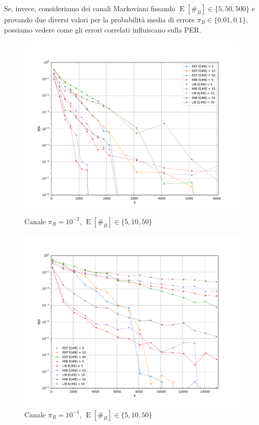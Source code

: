 \documentclass[italian, a4paper, 12pt]{article}
\newcommand{\E}[1]{\operatorname{E}\left[#1\right]}
\newcommand{\EnB}{\E{\#_B}}
\begin{document}
Se, invece, consideriamo dei canali Markoviani fissando $\EnB \in
\{5,50,500\}$ e provando due diversi valori per la probabilità media
di errore $\pi_B \in \{0.01, 0.1\}$, possiamo vedere come gli errori
correlati influiscano sulla PER.
%
\begin{figure}[H]
  \centering
  \includegraphics[width=\textwidth]{plot_markov_pi100small}
  \caption{Canale $\pi_B = 10^{-2}$, $\EnB \in \{5, 10, 50\}$}
  \label{fig:markov2}
\end{figure}
\begin{figure}[H]
  \centering
  \includegraphics[width=\textwidth]{plot_markov_pi10small}
  \caption{Canale $\pi_B = 10^{-1}$, $\EnB \in \{5, 10, 50\}$}
  \label{fig:markov1}
\end{figure}
\end{document}
